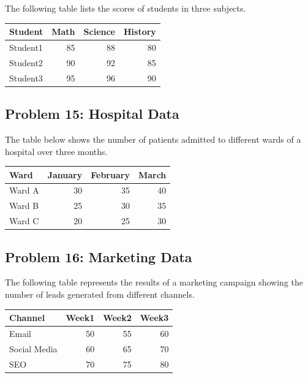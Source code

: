 \documentclass[
  letterpaper,
  DIV=11,
  numbers=noendperiod]{scrreprt}
\begin{document}
The following table lists the scores of students in three subjects.

\begin{table}
\centering
\begin{tabular}{l|r|r|r}
\hline
Student & Math & Science & History\\
\hline
Student1 & 85 & 88 & 80\\
\hline
Student2 & 90 & 92 & 85\\
\hline
Student3 & 95 & 96 & 90\\
\hline
\end{tabular}
\end{table}

\subsection*{Problem 15: Hospital Data}\label{problem-15-hospital-data}

The table below shows the number of patients admitted to different wards
of a hospital over three months.

\begin{table}
\centering
\begin{tabular}{l|r|r|r}
\hline
Ward & January & February & March\\
\hline
Ward A & 30 & 35 & 40\\
\hline
Ward B & 25 & 30 & 35\\
\hline
Ward C & 20 & 25 & 30\\
\hline
\end{tabular}
\end{table}

\subsection*{Problem 16: Marketing
Data}\label{problem-16-marketing-data}

The following table represents the results of a marketing campaign
showing the number of leads generated from different channels.

\begin{table}
\centering
\begin{tabular}{l|r|r|r}
\hline
Channel & Week1 & Week2 & Week3\\
\hline
Email & 50 & 55 & 60\\
\hline
Social Media & 60 & 65 & 70\\
\hline
SEO & 70 & 75 & 80\\
\hline
\end{tabular}
\end{table}
\end{document}
